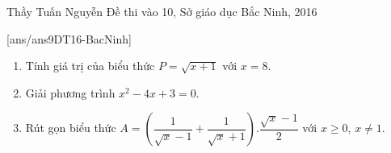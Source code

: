 \begin{name}
{Thầy  Tuấn Nguyễn}
{Đề thi vào 10, Sở giáo dục Bắc Ninh, 2016}
\end{name}
\setcounter{ex}{0}
[ans/ans9DT16-BacNinh]
\begin{ex}%
\hfill
\begin{enumerate}
\item Tính giá trị của biểu thức $P=\sqrt{x+1}$ với $x=8$.
\item Giải phương trình $x^2-4x+3=0$.
\item Rút gọn biểu thức $A=\left(\dfrac{1}{\sqrt{x}-1}+\dfrac{1}{\sqrt{x}+1}\right).\dfrac{\sqrt{x}-1}{2}$ với $x \ge 0$, $x \ne 1$.
\end{enumerate}

\end{ex}



